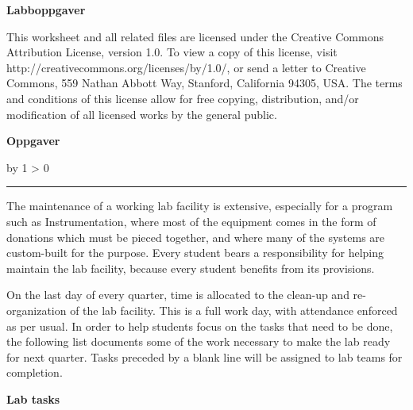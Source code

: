 \documentclass[12pt,a4paper]{book}
\def\oppgave{
            \advance\questnum by 1
            \ifnum \questnum > 0
                 \hrule
                 \vskip 3pt
                 \leftline{Oppgave \the\questnum}
                 \vskip 3pt \fi}
\begin{document}
\centerline{\bf Labboppgaver} \bigskip 
 
This worksheet and all related files are licensed under the Creative Commons Attribution License, version 1.0.  To view a copy of this license, visit http://creativecommons.org/licenses/by/1.0/, or send a letter to Creative Commons, 559 Nathan Abbott Way, Stanford, California 94305, USA.  The terms and conditions of this license allow for free copying, distribution, and/or modification of all licensed works by the general public.


\vfil \eject

\vfil \eject
\vfil \eject
\centerline{\bf Oppgaver}
\vskip 5pt
\oppgave{} 

The maintenance of a working lab facility is extensive, especially for a program such as Instrumentation, where most of the equipment comes in the form of donations which must be pieced together, and where many of the systems are custom-built for the purpose.  Every student bears a responsibility for helping maintain the lab facility, because every student benefits from its provisions.

On the last day of every quarter, time is allocated to the clean-up and re-organization of the lab facility.  This is a full work day, with attendance enforced as per usual.  In order to help students focus on the tasks that need to be done, the following list documents some of the work necessary to make the lab ready for next quarter.  Tasks preceded by a blank line will be assigned to lab teams for completion.

\vskip 10pt

\noindent
{\bf Lab tasks}
\end{document}
